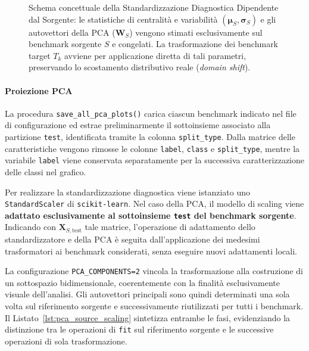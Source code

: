 \begin{figure}[H]
\caption{Schema concettuale della Standardizzazione Diagnostica Dipendente dal Sorgente: le statistiche di centralità e variabilità $(\boldsymbol{\mu}_S, \boldsymbol{\sigma}_S)$ e gli autovettori della PCA ($\mathbf{W}_S$) vengono stimati esclusivamente sul benchmark sorgente $S$ e congelati. La trasformazione dei benchmark target $T_k$ avviene per applicazione diretta di tali parametri, preservando lo scostamento distributivo reale (\textit{domain shift}).}
\label{fig:source_dependent_standardization_flow}
\end{figure}

\paragraph{Proiezione PCA}

La procedura \texttt{save\_all\_pca\_plots()} carica ciascun benchmark indicato nel file di configurazione ed estrae preliminarmente il sottoinsieme associato alla partizione \texttt{test}, identificata tramite la colonna \texttt{split\_type}. 
Dalla matrice delle caratteristiche vengono rimosse le colonne \texttt{label}, \texttt{class} e \texttt{split\_type}, mentre la variabile \texttt{label} viene conservata separatamente per la successiva caratterizzazione delle classi nel grafico.

Per realizzare la standardizzazione diagnostica viene istanziato uno \texttt{StandardScaler} di \newline \texttt{scikit-learn}. 
Nel caso della PCA, il modello di scaling viene \textbf{adattato esclusivamente al sottoinsieme \texttt{test} del benchmark sorgente}. 
Indicando con $\mathbf{X}_{S,\mathrm{test}}$ tale matrice, l'operazione di adattamento dello standardizzatore e della PCA è seguita dall'applicazione dei medesimi trasformatori ai benchmark considerati, senza eseguire nuovi adattamenti locali.

La configurazione \texttt{PCA\_COMPONENTS=2} vincola la trasformazione alla costruzione di un sottospazio bidimensionale, coerentemente con la finalità esclusivamente visuale dell'analisi. 
Gli autovettori principali sono quindi determinati una sola volta sul riferimento sorgente e successivamente riutilizzati per tutti i benchmark. 
Il Listato~\ref{lst:pca_source_scaling} sintetizza entrambe le fasi, evidenziando la distinzione tra le operazioni di \texttt{fit} sul riferimento sorgente e le successive operazioni di sola trasformazione.

